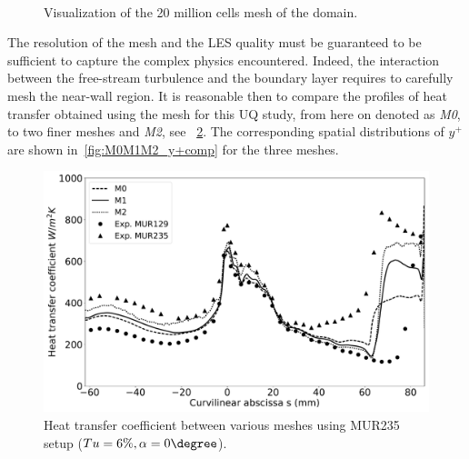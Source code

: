 \begin{figure}[!ht]               
\centering
{}
 ~       
\caption{Visualization of the 20 million cells mesh of the domain.}
\label{fig:ls89_mesh}
\end{figure}

The resolution of the mesh and the LES quality must be guaranteed to be sufficient to capture the complex physics encountered. Indeed, the interaction between the free-stream turbulence and the boundary layer requires to carefully mesh the near-wall region. It is reasonable then to compare the profiles of heat transfer obtained using the mesh for this UQ study, from here on denoted as \textit{M0}, to two finer meshes  and \textit{M2}, see ~\cref{fig:M0M1M2_hcomp}. The corresponding spatial distributions of ${y^+}$ are shown in~\cref{fig:M0M1M2_y+comp} for the three meshes.

\begin{figure}[!ht]
\centering
\includegraphics[width=0.8\linewidth,keepaspectratio]{fig/applications/ls89/Heatflux_M0M1M2_comp.pdf}
\caption{Heat transfer coefficient between various meshes using MUR235 setup ($Tu=6\%, \alpha = 0\degree$).}
\label{fig:M0M1M2_hcomp}
\end{figure}

